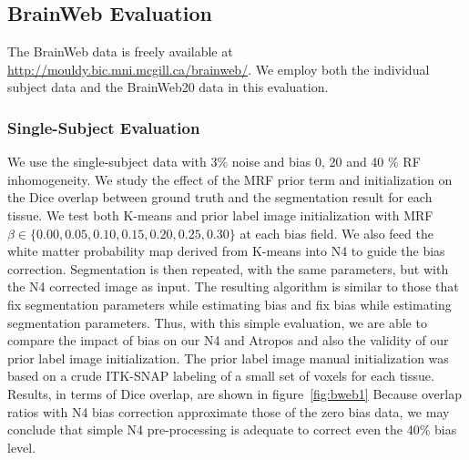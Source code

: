 \documentclass[11pt,english]{article}
\begin{document}
\subsection{BrainWeb Evaluation}
\label{sec:bweb} The BrainWeb data is freely available at
\url{http://mouldy.bic.mni.mcgill.ca/brainweb/}.  We employ both the
individual subject data and the BrainWeb20 data in this evaluation.
\subsubsection{Single-Subject Evaluation} We use the single-subject
data with 3\% noise and bias 0, 20 and 40 \% RF inhomogeneity.  We
study the effect of the MRF prior term and initialization on
the Dice overlap between ground truth and the segmentation result for
each tissue.  We test both K-means and prior label image
initialization with MRF $\beta \in \{ 0.00 , 0.05 , 0.10 , 0.15 , 0.20
, 0.25 , 0.30 \}$ at each bias field.  We also feed the white matter
probability map derived from K-means into N4 to guide the bias
correction.  Segmentation is then repeated, with the same parameters,
but with the N4 corrected image as input.  The resulting algorithm is
similar to those that fix segmentation parameters while
estimating bias and fix bias while estimating segmentation parameters.
Thus, with this simple evaluation, we are able to compare the impact
of bias on our N4 and Atropos and also the validity of our
prior label image initialization.  The prior label image manual
initialization was based on a crude ITK-SNAP labeling of a small
set of voxels for each tissue.  Results, in terms of
Dice overlap, are shown in figure~\ref{fig:bweb1}  Because overlap
ratios with N4 bias correction approximate those of the zero bias data, we may
conclude that simple N4 pre-processing is adequate to correct even the 40\%
bias level.
\end{document}
